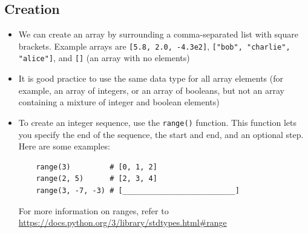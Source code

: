 \documentclass[a4paper,twoside]{memoir}
\newcommand{\shellcmd}{\texttt}
\begin{document}
\subsection{Creation}
\begin{itemize}
\item We can create an array by surrounding a comma-separated list with square brackets.  Example arrays are \shellcmd{[5.8, 2.0, -4.3e2]}, \shellcmd{["bob", "charlie", "alice"]}, and \shellcmd{[]} (an array with no elements)
\item It is good practice to use the same data type for all array elements (for example, an array of integers, or an array of booleans, but not an array containing a mixture of integer and boolean elements)
\item To create an integer sequence, use the \shellcmd{range()} function.  This function lets you specify the end of the sequence, the start and end, and an optional step.  Here are some examples:
\begin{verbatim}
	range(3)         # [0, 1, 2]
	range(2, 5)      # [2, 3, 4]
	range(3, -7, -3) # [__________________________]
\end{verbatim} 
For more information on ranges, refer to \url{https://docs.python.org/3/library/stdtypes.html#range}
\end{itemize}
\end{document}
